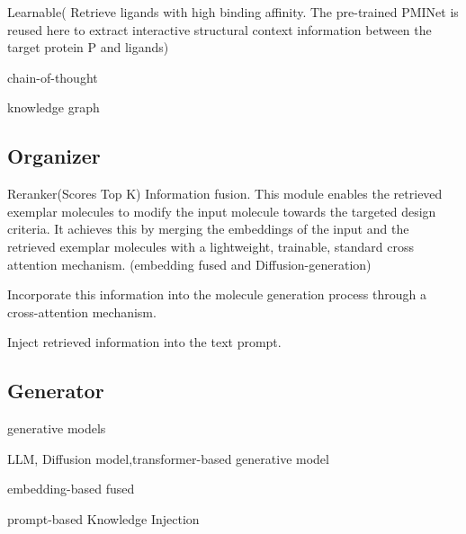 Learnable(
Retrieve ligands with high binding affinity.  The pre-trained PMINet
is reused here to extract interactive structural context information between the target protein P and ligands)

chain-of-thought 

knowledge graph
\subsection{Organizer}
Reranker(Scores Top K)
Information fusion. This module enables the retrieved exemplar molecules to modify the input
molecule towards the targeted design criteria. It achieves this by merging the embeddings of the
input and the retrieved exemplar molecules with a lightweight, trainable, standard cross attention
mechanism. (embedding fused and Diffusion-generation)

Incorporate this information into the molecule generation process through a cross-attention mechanism.

Inject retrieved information into the text prompt.
\subsection{Generator}
generative models

LLM, Diffusion model,transformer-based generative model


embedding-based fused

prompt-based Knowledge Injection
